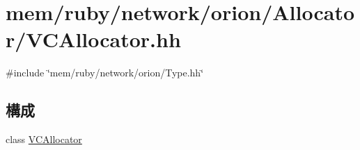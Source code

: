 \hypertarget{VCAllocator_8hh}{
\section{mem/ruby/network/orion/Allocator/VCAllocator.hh}
\label{VCAllocator_8hh}
}
{\ttfamily \#include \char`\"{}mem/ruby/network/orion/Type.hh\char`\"{}}\par
\subsection*{構成}
\begin{DoxyCompactItemize}
\item 
class \hyperlink{classVCAllocator}{VCAllocator}
\end{DoxyCompactItemize}

